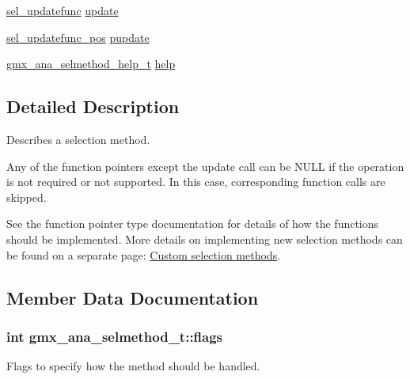 \begin{DoxyCompactItemize}
\item 
\hyperlink{share_2template_2gromacs_2selmethod_8h_a8492a3e2b034f195b558030d2bcecb18}{sel\-\_\-updatefunc} \hyperlink{structgmx__ana__selmethod__t_a18d9fe0bff35116b4e12cc63c381fb47}{update}
\item 
\hyperlink{share_2template_2gromacs_2selmethod_8h_a47bfb381e8df48bddd7ca78abff224bf}{sel\-\_\-updatefunc\-\_\-pos} \hyperlink{structgmx__ana__selmethod__t_a1c5c0b8aa5193ea0b329a649a9e166e7}{pupdate}
\item 
\hyperlink{structgmx__ana__selmethod__help__t}{gmx\-\_\-ana\-\_\-selmethod\-\_\-help\-\_\-t} \hyperlink{structgmx__ana__selmethod__t_ae7d6f1b14964a172d4d9ed38e50426a4}{help}
\end{DoxyCompactItemize}


\subsection{\-Detailed \-Description}
\-Describes a selection method. 

\-Any of the function pointers except the update call can be \-N\-U\-L\-L if the operation is not required or not supported. \-In this case, corresponding function calls are skipped.

\-See the function pointer type documentation for details of how the functions should be implemented. \-More details on implementing new selection methods can be found on a separate page\-: \hyperlink{selmethods}{\-Custom selection methods}. 

\subsection{\-Member \-Data \-Documentation}
\hypertarget{structgmx__ana__selmethod__t_a9ded7613b2752ddc1067766cd37af922}{
\subsubsection[{flags}]{\setlength{\rightskip}{0pt plus 5cm}int {\bf gmx\-\_\-ana\-\_\-selmethod\-\_\-t\-::flags}}}\label{structgmx__ana__selmethod__t_a9ded7613b2752ddc1067766cd37af922}


\-Flags to specify how the method should be handled. 

